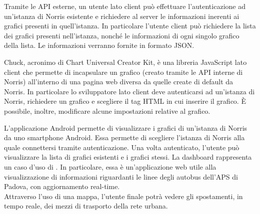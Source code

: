             Tramite le API esterne, un utente lato client può effettuare l'autenticazione ad un'istanza di Norris esistente e richiedere al server le informazioni inerenti ai grafici presenti in quell'istanza. In particolare l'utente client può richiedere la lista dei grafici presenti nell'istanza, nonché le informazioni di ogni singolo grafico della lista. Le informazioni verranno fornite in formato JSON.

        Chuck, acronimo di Chart Universal Creator Kit, è una libreria JavaScript lato client che permette di incapsulare un grafico (creato tramite le API interne di Norris) all'interno di una pagina web diversa da quelle create di default da Norris. In particolare lo sviluppatore lato client deve autenticarsi ad un'istanza di Norris, richiedere un grafico e scegliere il tag HTML in cui inserire il grafico. È possibile, inoltre, modificare alcune impostazioni relative al grafico.
    
        L'applicazione Android permette di visualizzare i grafici di un'istanza di Norris da uno smartphone Android. Essa permette di scegliere l'istanza di Norris alla quale connettersi tramite autenticazione. Una volta autenticato, l'utente può visualizzare la lista di grafici esistenti e i grafici stessi.
        La dashboard rappresenta un caso d'uso di \projectname{}. In particolare, essa è un'applicazione web utile alla visualizzazione di informazioni riguardanti le linee degli autobus dell'APS di Padova, con aggiornamento real-time.\\
        Attraverso l'uso di una mappa, l'utente finale potrà vedere gli spostamenti, in tempo reale, dei mezzi di trasporto della rete urbana.\\
    
